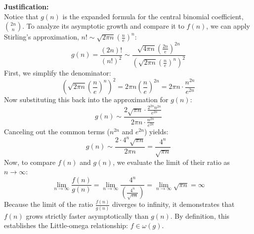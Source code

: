 \documentclass[11pt]{article}
\begin{document}
\begin{enumerate}[label=\textbf{(\alph*)}]
\textbf{Justification:}\\
Notice that $g(n)$ is the expanded formula for the central binomial coefficient, $\binom{2n}{n}$. To analyze its asymptotic growth and compare it to $f(n)$, we can apply Stirling's approximation, $n! \sim \sqrt{2\pi n} \left(\frac{n}{e}\right)^n$:
\[
g(n) = \frac{(2n)!}{(n!)^2} \sim \frac{\sqrt{4\pi n} \left(\frac{2n}{e}\right)^{2n}}{\left(\sqrt{2\pi n} \left(\frac{n}{e}\right)^n\right)^2}
\]
First, we simplify the denominator:
\[
\left(\sqrt{2\pi n} \left(\frac{n}{e}\right)^n\right)^2 = 2\pi n \left(\frac{n}{e}\right)^{2n} = 2\pi n \cdot \frac{n^{2n}}{e^{2n}}
\]
Now substituting this back into the approximation for $g(n)$:
\[
g(n) \sim \frac{2\sqrt{\pi n} \cdot \frac{2^{2n} n^{2n}}{e^{2n}}}{2\pi n \cdot \frac{n^{2n}}{e^{2n}}}
\]
Canceling out the common terms ($n^{2n}$ and $e^{2n}$) yields:
\[
g(n) \sim \frac{2 \cdot 4^n \sqrt{\pi n}}{2\pi n} = \frac{4^n}{\sqrt{\pi n}}
\]
Now, to compare $f(n)$ and $g(n)$, we evaluate the limit of their ratio as $n \to \infty$:
\[
\lim_{n \to \infty} \frac{f(n)}{g(n)} = \lim_{n \to \infty} \frac{4^n}{\left(\frac{4^n}{\sqrt{\pi n}}\right)} = \lim_{n \to \infty} \sqrt{\pi n} = \infty
\]
Because the limit of the ratio $\frac{f(n)}{g(n)}$ diverges to infinity, it demonstrates that $f(n)$ grows strictly faster asymptotically than $g(n)$. By definition, this establishes the Little-omega relationship: $f \in \omega(g)$.

\end{enumerate}

\end{document}
